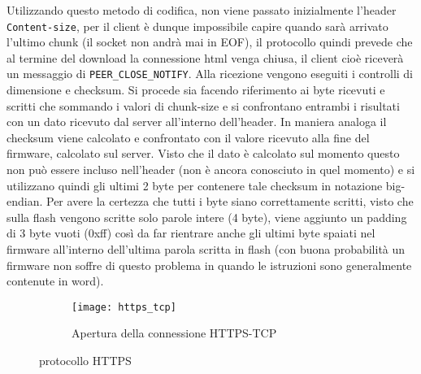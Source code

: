 Utilizzando questo metodo di codifica, non viene passato inizialmente l'header \texttt{Content-size}, per il client \`e dunque impossibile capire quando sar\`a arrivato l'ultimo chunk (il socket non andr\`a mai in EOF), il protocollo quindi prevede che al termine del download la connessione html venga chiusa, il client cio\`e ricever\`a un messaggio di \texttt{PEER\_CLOSE\_NOTIFY}. Alla ricezione vengono eseguiti i controlli di dimensione e checksum. Si procede sia facendo riferimento ai byte ricevuti e scritti che sommando i valori di chunk-size e si confrontano entrambi i risultati con un dato ricevuto dal server all'interno dell'header. In maniera analoga il checksum viene calcolato e confrontato con il valore ricevuto alla fine del firmware, calcolato sul server. Visto che il dato \`e calcolato sul momento questo non pu\`o essere incluso nell'header (non \`e ancora conosciuto in quel momento) e si utilizzano quindi gli ultimi 2 byte per contenere tale checksum in notazione big-endian. Per avere la certezza che tutti i byte siano correttamente scritti, visto che sulla flash vengono scritte solo parole intere (4 byte), viene aggiunto un padding di 3 byte vuoti (0xff) cos\`i da far rientrare anche gli ultimi byte spaiati nel firmware all'interno dell'ultima parola scritta in flash (con buona probabilit\`a un firmware non soffre di questo problema in quando le istruzioni sono generalmente contenute in word).

\begin{figure}[ht]
  \center
  \begin{subfigure}{\textwidth}
    \texttt{[image: https\_tcp]}
    \caption{Apertura della connessione HTTPS-TCP}
  \end{subfigure}
  \caption{protocollo HTTPS}
\end{figure}

\newpage

